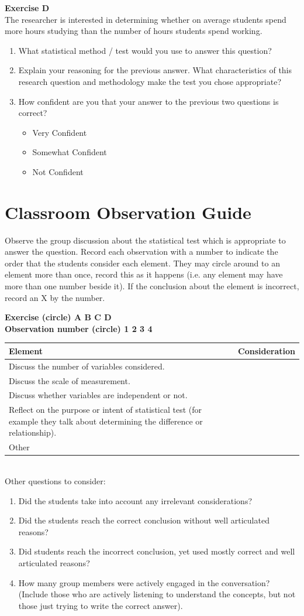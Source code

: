 \documentclass[12pt]{article}
\newcommand{\bi}{\begin{itemize}}
\newcommand{\ei}{\end{itemize}}
\newcommand{\be}{\begin{enumerate}}
\newcommand{\ee}{\end{enumerate}}
\newcommand{\appsection}[1]
{
\let\oldthesection\thesection
\renewcommand{\thesection}{Appendix \oldthesection}
\section{#1}\let\thesection\oldthesection
\renewcommand{\theequation}{\thesection\arabic{equation}}
\setcounter{equation}{0}
}
\begin{document}
\noindent \textbf{Exercise D}\\
The researcher is interested in determining whether on average students spend more hours studying than the number of hours students spend working.
\be
\item What statistical method / test would you use to answer this question?
\item Explain your reasoning for the previous answer.  What characteristics of this research question and methodology make the test you chose appropriate?
\item How confident are you that your answer to the previous two questions is correct?  
\bi \item Very Confident \item Somewhat Confident \item Not Confident \ei
\ee

\newpage
\appsection{Classroom Observation Guide}
Observe the group discussion about the statistical test which is appropriate to answer the question. Record each observation with a number to indicate the order that the students consider each element. They may circle around to an element more than once, record this as it happens (i.e. any element may have more than one number beside it). If the conclusion about the element is incorrect, record an X by the number. 

\noindent \textbf{Exercise (circle) A B C D} \\
\noindent \textbf{Observation number (circle) 1 2 3 4} \\

\begin{tabular}{|p{4.5in}|l|} \hline
Element & Consideration \\ \hline
Discuss the number of variables considered. & \\ \hline
Discuss the scale of measurement. & \\ \hline
Discuss whether variables are independent or not. & \\ \hline
Reflect on the purpose or intent of statistical test (for example they talk about determining the difference or relationship). & \\ \hline
Other & \\ \hline
\end{tabular} \\

\noindent Other questions to consider: 
\be
\item Did the students take into account any irrelevant considerations?
\item Did the students reach the correct conclusion without well articulated reasons?
\item Did students reach the incorrect conclusion, yet used mostly correct and well articulated reasons?
\item How many group members were actively engaged in the conversation? (Include those who are actively listening to understand the concepts, but not those just trying to write the correct answer).
\ee

\newpage
\nocite{*}
\begin{singlespace}


\end{singlespace}
\end{document}
